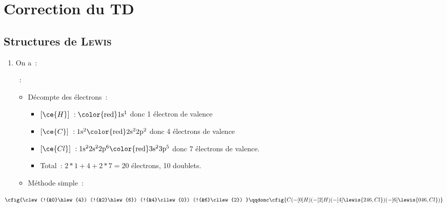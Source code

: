 \documentclass[a4paper, 12pt, final, garamond]{book}
\begin{document}

\chapter{Correction du TD}

\section{Structures de \textsc{Lewis}}
\begin{enumerate}
    \item On a~:
        \begin{itemize}[label=$\diamond$, leftmargin=10pt]
            ~:
                \begin{itemize}[label=$\triangleright$, leftmargin=20pt]
                    \item Décompte des électrons~:
                        \begin{itemize}[label=$\ra$, leftmargin=20pt]
                            \item $[\ce{H}]~: \rm \color{red}1s^1$
                                donc 1 électron de valence
                            \item $[\ce{C}]~: \rm 1s^2\color{red}2s^22p^2$
                                donc 4 électrons de valence
                            \item $[\ce{Cl}]~: \rm 1s^22s^22p^6\color{red}3s^23p^5$
                                donc 7 électrons de valence.
                            \item Total~: $2*1 + 4 + 2*7 = 20$ électrons, 10
                                doublets.
                        \end{itemize}
                    \item Méthode simple~:
                \end{itemize}
        \end{itemize}
\end{enumerate}
\[
    \cfig{\clew
        (!{&0}\hlew{4})
        (!{&2}\hlew{6})
        (!{&4}\cllew{0})
        (!{&6}\cllew{2})
    }
    \qqdonc
    \cfig{C(-[0]H)(-[2]H)(-[4]\lewis{246,Cl})(-[6]\lewis{046,Cl})}
\]
\bigbreak
\end{document}
